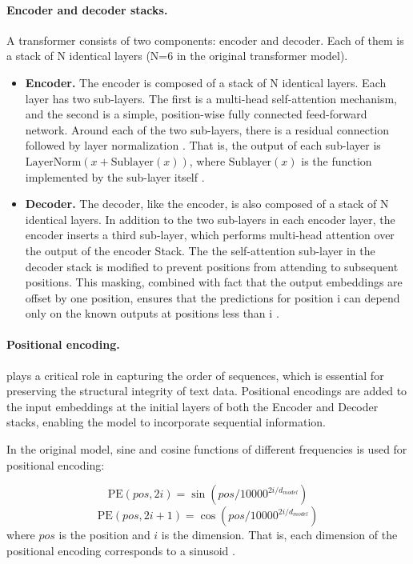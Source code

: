 \paragraph*{Encoder and decoder stacks.} A transformer consists of two components: encoder and decoder. Each of them is a stack of N identical layers (N=6 in the original transformer model).
\begin{itemize}
    \item \textbf{Encoder.} The encoder is composed of a stack of N identical layers. Each layer has two sub-layers. The first is a multi-head self-attention mechanism, and the second is a simple, position-wise fully connected feed-forward network. Around each of the two sub-layers, there is a residual connection \cite{he2016residualcon} followed by layer normalization \cite{ba2016layernorm}. That is, the output of each sub-layer is $\text{LayerNorm}(x + \text{Sublayer}(x))$, where $\text{Sublayer}(x)$ is the function implemented by the sub-layer itself \cite{vaswani2017}.
    \item \textbf{Decoder.} The decoder, like the encoder, is also composed of a stack of N identical layers. In addition to the two sub-layers in each encoder layer, the encoder inserts a third sub-layer, which performs multi-head attention over the output of the encoder Stack. The the self-attention sub-layer in the decoder stack is modified to prevent positions from attending to subsequent positions. This masking, combined with fact that the output embeddings are offset by one position, ensures that the predictions for position i can depend only on the known outputs at positions less than i \cite{vaswani2017}.
\end{itemize}

\paragraph*{Positional encoding.} plays a critical role in capturing the order of sequences, which is essential for preserving the structural integrity of text data. Positional encodings are added to the input embeddings at the initial layers of both the Encoder and Decoder stacks, enabling the model to incorporate sequential information. 

In the original model, sine and cosine functions of different frequencies is used for positional encoding:
    
\begin{equation}\label{Eq:PE_sin}
    \text{PE}(pos,2i)=\sin(pos/{10000^{2i/d_{model}}}) 
\end{equation}
\begin{equation}\label{Eq:PE_cos}
    \text{PE}(pos,2i+1)=\cos(pos/{10000^{2i/d_{model}}})
\end{equation}
where $pos$ is the position and $i$ is the dimension. That is, each dimension of the positional encoding corresponds to a sinusoid \cite{vaswani2017}.

